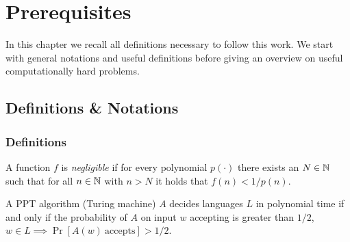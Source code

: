 \chapter{Prerequisites}\label{ch:background}
In this chapter we recall all definitions necessary to follow this work.
We start with general notations and useful definitions before giving an overview on useful computationally hard problems.

\section{Definitions \& Notations}

\subsection{Definitions}

\begin{definition}\label{def:negligible}
A function $f$ is \emph{negligible} if for every polynomial $p(\cdot)$ there exists an $N\in\mathbb{N}$ such that for all $n\in\mathbb{N}$ with $n>N$ it holds that $f(n)<1/p(n)$.
\eod
\end{definition}

\begin{definition}\label{def:asymptotic}
\eod
\end{definition}

\begin{definition}\label{def:ppt}
A \acl{PPT} algorithm (Turing machine) $A$ decides languages $L$ in polynomial time if and only if the probability of $A$ on input $w$ accepting is greater than $1/2$, \ie $w\in L\implies\Pr[A(w) \mathrm{~accepts}]>1/2$.
\eod
\end{definition}


